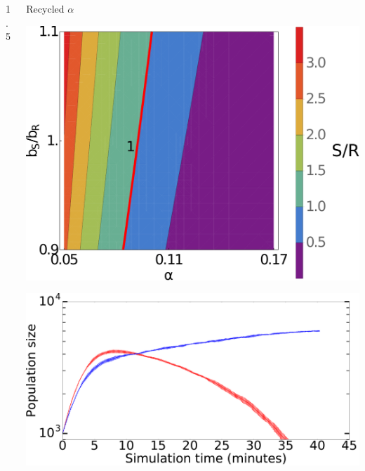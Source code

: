 \documentclass[final]{beamer}
\newlength{\sepwid}
\newlength{\onecolwid}
\newlength{\figwid}
\begin{document}
\begin{frame}[t]
\begin{block}
\begin{columns}[t]
\vrule width 5pt
\begin{column}{1.5\sepwid}\end{column} %
\begin{column}{\onecolwid}

  \begin{block}{Recycled $\alpha$}
    \begin{center}
      \includegraphics[width=\figwid]{../dev/graphics/poster/recycled_contour.pdf}

      \includegraphics[width=\figwid]{../dev/graphics/poster/recycled_pop.pdf}
    \end{center}


\end{block}
\end{column}
\end{columns}
\end{block}
\end{frame}
\end{document}
